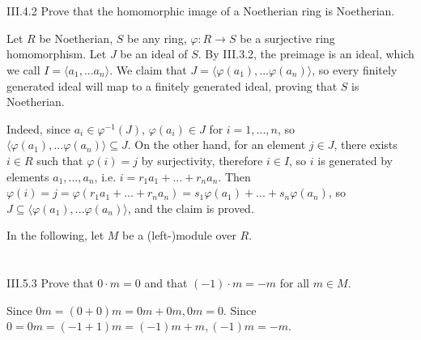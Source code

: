 \section{}

\begin{problem}{III.4.2}
Prove that the homomorphic image of a Noetherian ring is Noetherian.
\end{problem}
\begin{pf}
Let $R$ be Noetherian, $S$ be any ring, $\varphi:R \to S$ be a surjective ring homomorphism.
Let $J$ be an ideal of $S$. By III.3.2, the preimage is an ideal, which we call $I = \langle a_1, ... a_n \rangle$. We claim that $J = \langle \varphi(a_1), ... \varphi(a_n) \rangle$, so every finitely generated ideal will map to a finitely generated ideal, proving that $S$ is Noetherian. 

Indeed, since $a_i \in \varphi^{-1}(J)$, $\varphi(a_i) \in J$ for $i = 1,...,n$, so $\langle \varphi(a_1), ... \varphi(a_n) \rangle \subseteq J$. On the other hand, for an element $j \in J$, there exists $i \in R$ such that $\varphi(i) = j$ by surjectivity, therefore $i \in I$, so $i$ is generated by elements $a_1, ... ,a_n$, i.e. $i = r_1a_1 + ... + r_na_n$. Then $\varphi(i) = j = \varphi(r_1a_1 + ... + r_na_n) = s_1\varphi(a_1) + ... + s_n\varphi(a_n)$, so $J \subseteq \langle \varphi(a_1), ... \varphi(a_n) \rangle$, and the claim is proved.
\end{pf}

\el

In the following, let $M$ be a (left-)module over $R$.

\section{}

\begin{problem}{III.5.3}
Prove that $0\cdot m = 0$ and that $(-1) \cdot m = -m$ for all $m \in M$. 
\end{problem}
\begin{pf}
Since $0m = (0+0)m = 0m + 0m, 0m = 0$. Since $0 = 0m = (-1+1)m = (-1)m+m, (-1)m = -m$.
\end{pf}


